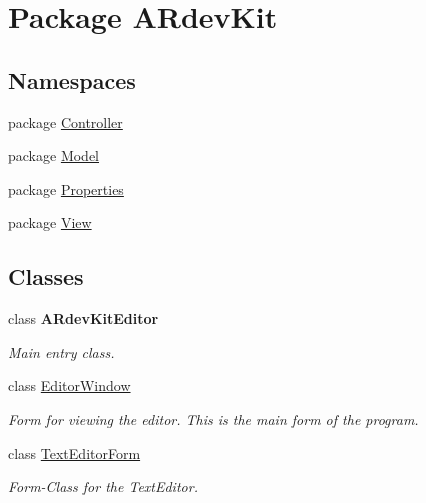 \hypertarget{namespace_a_rdev_kit}{\section{Package A\-Rdev\-Kit}
\label{namespace_a_rdev_kit}
}
\subsection*{Namespaces}
\begin{DoxyCompactItemize}
\item 
package \hyperlink{namespace_a_rdev_kit_1_1_controller}{Controller}
\item 
package \hyperlink{namespace_a_rdev_kit_1_1_model}{Model}
\item 
package \hyperlink{namespace_a_rdev_kit_1_1_properties}{Properties}
\item 
package \hyperlink{namespace_a_rdev_kit_1_1_view}{View}
\end{DoxyCompactItemize}
\subsection*{Classes}
\begin{DoxyCompactItemize}
\item 
class {\bfseries A\-Rdev\-Kit\-Editor}
\begin{DoxyCompactList}\small\item\em Main entry class. \end{DoxyCompactList}\item 
class \hyperlink{class_a_rdev_kit_1_1_editor_window}{Editor\-Window}
\begin{DoxyCompactList}\small\item\em Form for viewing the editor. This is the main form of the program. \end{DoxyCompactList}\item 
class \hyperlink{class_a_rdev_kit_1_1_text_editor_form}{Text\-Editor\-Form}
\begin{DoxyCompactList}\small\item\em Form-\/\-Class for the Text\-Editor. \end{DoxyCompactList}\end{DoxyCompactItemize}
